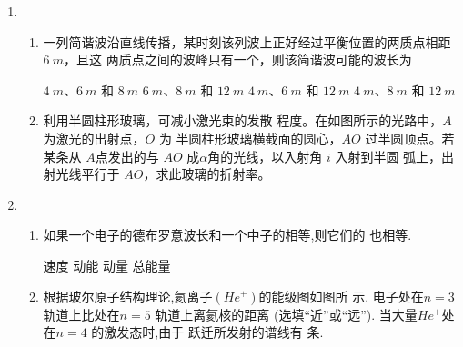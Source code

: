 \begin{enumerate}
\begin{enumerate}
\end{enumerate}


\item 
{}
\begin{enumerate}
	\item
一列简谐波沿直线传播，某时刻该列波上正好经过平衡位置的两质点相距 $ 6 \ m $，且这
两质点之间的波峰只有一个，则该简谐波可能的波长为  

\fourchoices
{$ 4 \ m $、$ 6 \ m $ 和 $ 8 \ m $}
{$ 6 \ m $、$ 8 \ m $ 和 $ 12 \ m $}
{$ 4 \ m $、$ 6 \ m $ 和 $ 12 \ m $}
{$ 4 \ m $、$ 8 \ m $ 和 $ 12 \ m $}



\item 
利用半圆柱形玻璃，可减小激光束的发散
程度。在如图所示的光路中，$ A $ 为激光的出射点，$ O $ 为
半圆柱形玻璃横截面的圆心，$ AO $ 过半圆顶点。若某条从
$ A $点发出的与 $ AO $ 成$ \alpha $角的光线，以入射角 $ i $ 入射到半圆
弧上，出射光线平行于 $ AO $，求此玻璃的折射率。
\begin{figure}[h!]
	\flushright
	
\end{figure}




\end{enumerate}


\item 
{}
\begin{enumerate}
	\item
如果一个电子的德布罗意波长和一个中子的相等,则它们的 \underlinegap 也相等.

\fourchoices
{速度}
{动能}
{动量}
{总能量}


\item 
根据玻尔原子结构理论,氦离子$ (He^{+}) $的能级图如图所
示. 电子处在$ n=3 $ 轨道上比处在$ n=5 $ 轨道上离氦核的距离 \underlinegap (选填“近”或“远”). 当大量$ He^{+} $处在$ n=4 $ 的激发态时,由于
跃迁所发射的谱线有 \underlinegap 条.
\begin{figure}[h!]
	\flushright
	
\end{figure}


\end{enumerate}
\end{enumerate}
